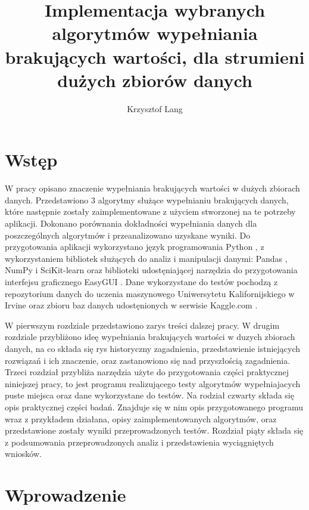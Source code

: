 \documentclass[12pt,twoside]{article}
\author{Krzysztof Lang}
\title{Implementacja wybranych algorytmów wypełniania brakujących wartości, dla strumieni dużych zbiorów danych}
\begin{document}
\maketitle

\blankpage

\tableofcontents
\clearpage
\blankpage


\section{Wstęp}

W pracy opisano znaczenie wypełniania brakujących wartości w dużych zbiorach danych.
Przedstawiono 3 algorytmy służące wypełnianiu brakujących danych, które następnie zostały zaimplementowane z użyciem
stworzonej na te potrzeby aplikacji. Dokonano porównania dokładności wypełniania danych dla poszczególnych algorytmów
i przeanalizowano uzyskane wyniki. Do przygotowania aplikacji wykorzystano język programowania Python \cite{python},
z wykorzystaniem bibliotek służących do analiz i manipulacji danymi: Pandas \cite{pandas},
NumPy \cite{numpy} i SciKit-learn \cite{scikit} oraz biblioteki
udostęniającej narzędzia do przygotowania interfejsu graficznego EasyGUI \cite{easygui}.
Dane wykorzystane do testów pochodzą z repozytorium danych do uczenia maszynowego
Uniwersytetu Kalifornijskiego w Irvine \cite{uci} oraz zbioru baz danych
udostęnionych w serwisie Kaggle.com  \cite{kaggle}.

W pierwszym rozdziale przedstawiono zarys treści dalszej pracy.
W drugim rozdziale przybliżono ideę wypełniania brakujących wartości w duzych zbiorach danych,
na co składa się rys historyczny zagadnienia, przedstawienie istniejących rozwiązań i ich znaczenie,
oraz zastanowiono się nad przyszłością zagadnienia.
Trzeci rozdział przybliża narzędzia użyte do przygotowania części praktycznej niniejszej pracy,
to jest programu realizującego testy algorytmów wypełniajacych puste miejsca oraz
dane wykorzystane do testów.
Na rodział czwarty składa się opis praktycznej części badań.
Znajduje się w nim opis przygotowanego programu wraz z przykładem działana, opisy zaimplementowanych algorytmów,
oraz przedstawione zostały wyniki przeprowadzonych testów.
Rozdział piąty składa się z podsumowania przeprowadzonych analiz i przedstawienia wyciągniętych wniosków.

\clearpage


\section{Wprowadzenie}
\end{document}
